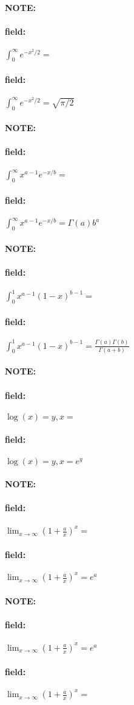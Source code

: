 \documentclass[12pt]{article}
\newenvironment{note}{\paragraph{NOTE:}}{}
\newenvironment{field}{\paragraph{field:}}{}
\begin{document}



\begin{note}
  \begin{field}
    $\int_0^\infty e^{-x^2/2} = $
  \end{field}
  \begin{field}
    $\int_0^\infty e^{-x^2/2} = \sqrt{\pi/2}$
  \end{field}
\end{note}


\begin{note}
  \begin{field}
    $\int_0^\infty x^{a-1}e^{-x/b} = $
  \end{field}
  \begin{field}
    $\int_0^\infty x^{a-1}e^{-x/b} = \Gamma(a)b^a$
  \end{field}
\end{note}

\begin{note}
  \begin{field}
    $\int_0^1 x^{a - 1}(1 - x)^{b-1} = $
  \end{field}
  \begin{field}
    $\int_0^1 x^{a - 1}(1 - x)^{b-1} = \frac{\Gamma(a)\Gamma(b)}{\Gamma(a + b)}$
  \end{field}
\end{note}

\begin{note}
  \begin{field}
    $\log(x) = y , x = $
  \end{field}
  \begin{field}
    $\log(x) = y , x = e^y$
  \end{field}
\end{note}

\begin{note}
  \begin{field}
    $\lim_{x \to \infty}( 1 + \frac{a}{x})^x = $
  \end{field}
    \begin{field}
      $\lim_{x \to \infty}( 1 + \frac{a}{x})^x = e^a$
    \end{field}
\end{note}

\begin{note}
  \begin{field}
    $\lim_{x \to \infty}( 1 + \frac{a}{x})^x = e^a$
  \end{field}
  \begin{field}
    $\lim_{x \to \infty}( 1 + \frac{a}{x})^x = $
  \end{field}
\end{note}
\end{document}
